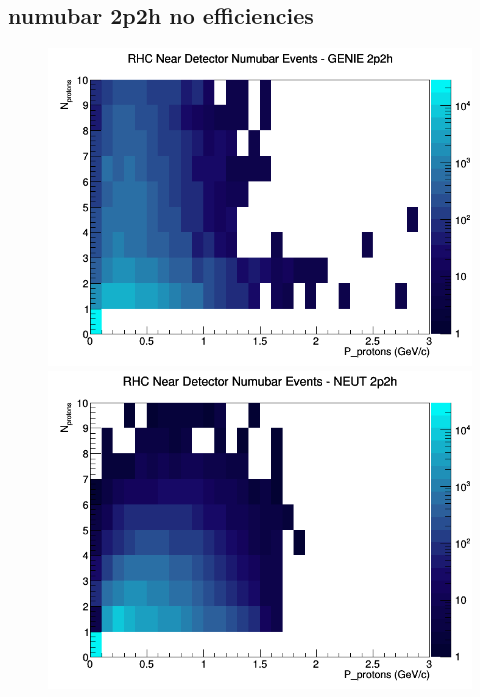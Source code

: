 \subsection{numubar 2p2h no efficiencies}
\begin{figure}[h]
\includegraphics[width=\linewidth]{N_P/nominal/protons/2p2h_RHC_ND_numubar_N_P_GENIE.png}
\endminipage
{}
\includegraphics[width=\linewidth]{N_P/nominal/protons/2p2h_RHC_ND_numubar_N_P_NEUT.png}
\endminipage
{}

\end{figure}
